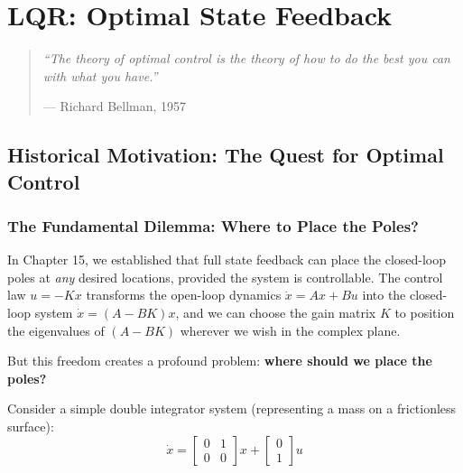 
\chapter{LQR: Optimal State Feedback}
\label{ch:lqr}

\begin{quote}
\textit{``The theory of optimal control is the theory of how to do the best you can with what you have.''}
\begin{flushright}
--- Richard Bellman, 1957
\end{flushright}
\end{quote}

\section{Historical Motivation: The Quest for Optimal Control}
\label{sec:lqr_history}

\subsection{The Fundamental Dilemma: Where to Place the Poles?}

In Chapter 15, we established that full state feedback can place the closed-loop poles at \textit{any} desired locations, provided the system is controllable. The control law $u = -Kx$ transforms the open-loop dynamics $\dot{x} = Ax + Bu$ into the closed-loop system $\dot{x} = (A - BK)x$, and we can choose the gain matrix $K$ to position the eigenvalues of $(A - BK)$ wherever we wish in the complex plane.

But this freedom creates a profound problem: \textbf{where should we place the poles?}

Consider a simple double integrator system (representing a mass on a frictionless surface):
\begin{equation}
\dot{x} = \begin{bmatrix} 0 & 1 \\ 0 & 0 \end{bmatrix} x + \begin{bmatrix} 0 \\ 1 \end{bmatrix} u
\end{equation}

